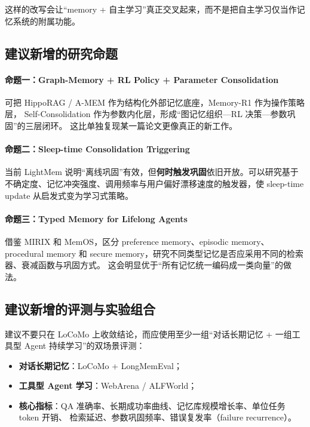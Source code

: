 \documentclass[11pt,a4paper]{article}
\begin{document}
这样的改写会让“memory + 自主学习”真正交叉起来，而不是把自主学习仅当作记忆系统的附属功能。

\subsection{建议新增的研究命题}

\paragraph{命题一：Graph-Memory + RL Policy + Parameter Consolidation}
可把 HippoRAG / A-MEM 作为结构化外部记忆底座，Memory-R1 作为操作策略层，
Self-Consolidation 作为参数内化层，形成“图记忆组织—RL 决策—参数巩固”的三层闭环。
这比单独复现某一篇论文更像真正的新工作。

\paragraph{命题二：Sleep-time Consolidation Triggering}
当前 LightMem 说明“离线巩固”有效，但\textbf{何时触发巩固}依旧开放。可以研究基于
不确定度、记忆冲突强度、调用频率与用户偏好漂移速度的触发器，使 sleep-time update
从启发式变为学习式策略。

\paragraph{命题三：Typed Memory for Lifelong Agents}
借鉴 MIRIX 和 MemOS，区分 preference memory、episodic memory、procedural memory
和 secure memory，研究不同类型记忆是否应采用不同的检索器、衰减函数与巩固方式。
这会明显优于“所有记忆统一编码成一类向量”的做法。

\subsection{建议新增的评测与实验组合}

建议不要只在 LoCoMo 上收敛结论，而应使用至少一组“对话长期记忆 + 一组工具型 Agent
持续学习”的双场景评测：
\begin{itemize}
  \item \textbf{对话长期记忆}：LoCoMo + LongMemEval；
  \item \textbf{工具型 Agent 学习}：WebArena / ALFWorld；
  \item \textbf{核心指标}：QA 准确率、长期成功率曲线、记忆库规模增长率、单位任务 token 开销、
  检索延迟、参数巩固频率、错误复发率（failure recurrence）。
\end{itemize}
\end{document}
